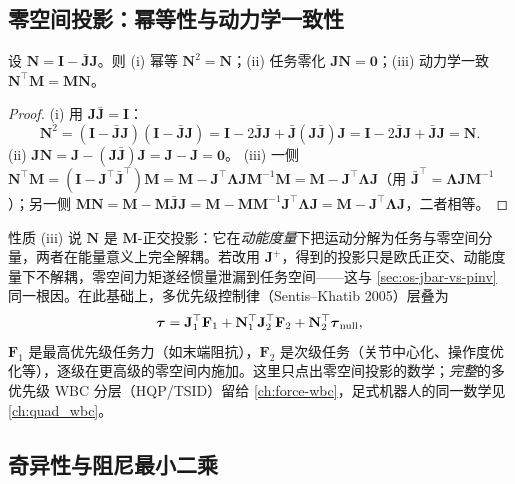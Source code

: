 \subsection{零空间投影：幂等性与动力学一致性}
\label{sec:os-nullspace}

\begin{theorem}[零空间投影矩阵的性质]
\label{thm:os-nullspace}
设 $\mathbf N=\mathbf I-\bar{\mathbf J}\mathbf J$。则 (i) 幂等 $\mathbf N^2=\mathbf N$；(ii) 任务零化 $\mathbf J\mathbf N=\mathbf 0$；(iii) 动力学一致 $\mathbf N^\top\mathbf M=\mathbf M\mathbf N$。
\end{theorem}
\begin{proof}
(i) 用 $\mathbf J\bar{\mathbf J}=\mathbf I$：
\[
  \mathbf N^2=(\mathbf I-\bar{\mathbf J}\mathbf J)(\mathbf I-\bar{\mathbf J}\mathbf J)=\mathbf I-2\bar{\mathbf J}\mathbf J+\bar{\mathbf J}(\mathbf J\bar{\mathbf J})\mathbf J=\mathbf I-2\bar{\mathbf J}\mathbf J+\bar{\mathbf J}\mathbf J=\mathbf N.
\]
(ii) $\mathbf J\mathbf N=\mathbf J-(\mathbf J\bar{\mathbf J})\mathbf J=\mathbf J-\mathbf J=\mathbf 0$。
(iii) 一侧 $\mathbf N^\top\mathbf M=(\mathbf I-\mathbf J^\top\bar{\mathbf J}^\top)\mathbf M=\mathbf M-\mathbf J^\top\boldsymbol\Lambda\mathbf J\mathbf M^{-1}\mathbf M=\mathbf M-\mathbf J^\top\boldsymbol\Lambda\mathbf J$（用 $\bar{\mathbf J}^\top=\boldsymbol\Lambda\mathbf J\mathbf M^{-1}$）；另一侧 $\mathbf M\mathbf N=\mathbf M-\mathbf M\bar{\mathbf J}\mathbf J=\mathbf M-\mathbf M\mathbf M^{-1}\mathbf J^\top\boldsymbol\Lambda\mathbf J=\mathbf M-\mathbf J^\top\boldsymbol\Lambda\mathbf J$，二者相等。
\end{proof}

性质 (iii) 说 $\mathbf N$ 是 $\mathbf M$-正交投影：它在\emph{动能度量}下把运动分解为任务与零空间分量，两者在能量意义上完全解耦。若改用 $\mathbf J^+$，得到的投影只是欧氏正交、动能度量下不解耦，零空间力矩遂经惯量泄漏到任务空间——这与 \cref{sec:os-jbar-vs-pinv} 同一根因。在此基础上，多优先级控制律（Sentis--Khatib 2005）层叠为
\begin{equation}
  \boldsymbol\tau=\mathbf J_1^\top\mathbf F_1+\mathbf N_1^\top\mathbf J_2^\top\mathbf F_2+\mathbf N_2^\top\boldsymbol\tau_{\rm null},
  \label{eq:os-multipriority}
\end{equation}
$\mathbf F_1$ 是最高优先级任务力（如末端阻抗），$\mathbf F_2$ 是次级任务（关节中心化、操作度优化等），逐级在更高级的零空间内施加。这里只点出零空间投影的数学；\emph{完整}的多优先级 WBC 分层（HQP/TSID）留给 \cref{ch:force-wbc}，足式机器人的同一数学见 \cref{ch:quad_wbc}。

\subsection{奇异性与阻尼最小二乘}
\label{sec:os-dls}

